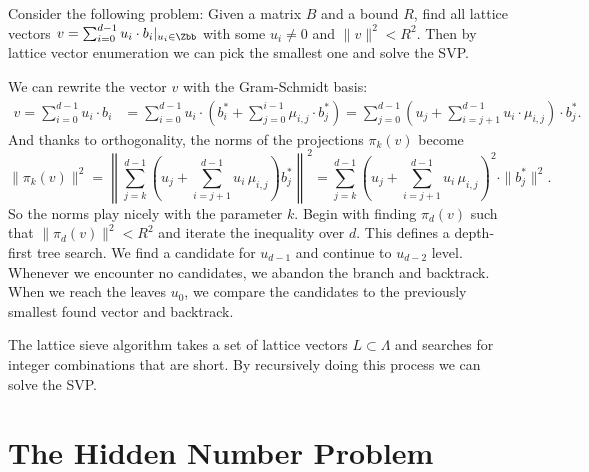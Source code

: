 \begin{definition}[Enumeration]
    Consider the following problem: Given a matrix $B$ and a bound $R$, find all lattice vectors $v = \sum_{i=0}^{d-1} u_i \cdot b_i |_{u_i \in \Zbb}$ with some $u_i \not = 0$ and $\|v\|^2 < R^2$. Then by lattice vector enumeration we can pick the smallest one and solve the SVP.

    We can rewrite the vector $v$ with the Gram-Schmidt basis:
    \begin{align*}
        v = \sum_{i=0}^{d-1} u_i \cdot b_i &= \sum_{i=0}^{d-1} u_i \cdot \left( b_i^* + \sum_{j=0}^{i-1} \mu_{i,j} \cdot b_j^* \right) = \sum_{j=0}^{d-1} \left( u_j + \sum_{i=j+1}^{d-1} u_i \cdot \mu_{i,j} \right) \cdot b_j^*.
    \end{align*}
    And thanks to orthogonality, the norms of the projections $\pi_k(v)$ become
    \begin{equation*}
        \| \pi_k(v) \|^2 = \left\| \sum_{j=k}^{d-1} \left( u_j + \sum_{i=j+1}^{d-1} u_i \, \mu_{i,j} \right) b_j^* \right\|^2 = \sum_{j=k}^{d-1} \left( u_j + \sum_{i=j+1}^{d-1} u_i \, \mu_{i,j} \right)^2 \cdot \| b_j^* \|^2.
    \end{equation*}
    So the norms play nicely with the parameter $k$. Begin with finding $\pi_d(v)$ such that $\| \pi_d(v) \|^2 < R^2$
    and iterate the inequality over $d$. This defines a depth-first tree search. We find a candidate for $u_{d-1}$ and continue to $u_{d-2}$ level. Whenever we encounter no candidates, we abandon the branch and backtrack. When we reach the leaves $u_0$, we compare the candidates to the previously smallest found vector and backtrack.
\end{definition}

\begin{definition}[Sieving]
    The lattice sieve algorithm takes a set of lattice vectors $L \subset \Lambda$ and searches for integer combinations that are short. By recursively doing this process we can solve the SVP.
\end{definition}

\begin{definition}[BKZ]
    
\end{definition}


\section{The Hidden Number Problem}

